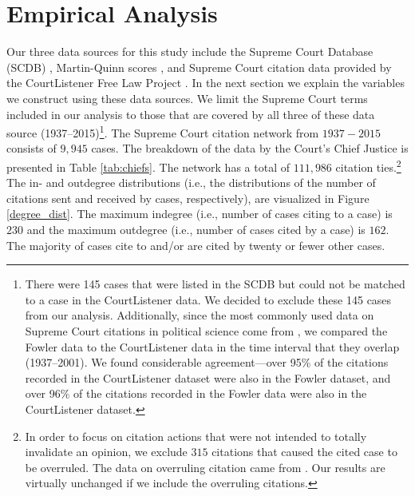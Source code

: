 \documentclass[headsepline=true, abstracton]{scrartcl}
\begin{document}


 \section{Empirical Analysis}
Our three data sources for this study include the Supreme Court Database (SCDB) \citep{spaeth2014supreme}, Martin-Quinn scores \citep{martin2002dynamic}, and Supreme Court citation data provided by the CourtListener Free Law Project \citep{CourtListener}. In the next section we explain the variables we construct using these data sources. We limit the Supreme Court terms included in our analysis to those that are covered by all three of these data source (1937--2015)\footnote{There were 145 cases that were listed in the SCDB but could not be matched to a case in the CourtListener data. We decided to exclude these 145 cases from our analysis. Additionally, since the most commonly used data on Supreme Court citations in political science come from \citet{fowler2007network}, we compared the Fowler data to the CourtListener data in the time interval that they overlap (1937--2001). We found considerable agreement---over 95\% of the citations recorded in the CourtListener dataset were also in the Fowler dataset, and over 96\% of the citations recorded in the Fowler data were also in the CourtListener dataset.}. The Supreme Court citation network from $1937 - 2015$ consists of $9,945$ cases. The breakdown of the data by the Court's Chief Justice is presented in Table \ref{tab:chiefs}. The network has a total of $111,986$ citation ties.\footnote{In order to focus on citation actions that were not intended to totally invalidate an opinion, we exclude $315$ citations that caused the cited case to be overruled. The data on overruling citation came from \citet{senate2016constitution}. Our results are virtually unchanged if we include the overruling citations.} The in- and outdegree distributions (i.e., the distributions of the number of citations sent and received by cases, respectively), are visualized in Figure \ref{degree_dist}. The maximum indegree (i.e., number of cases citing to a case) is $230$ and the maximum outdegree (i.e., number of cases cited by a case) is $162$. The majority of cases cite to and/or are cited by twenty or fewer other cases.
\end{document}
